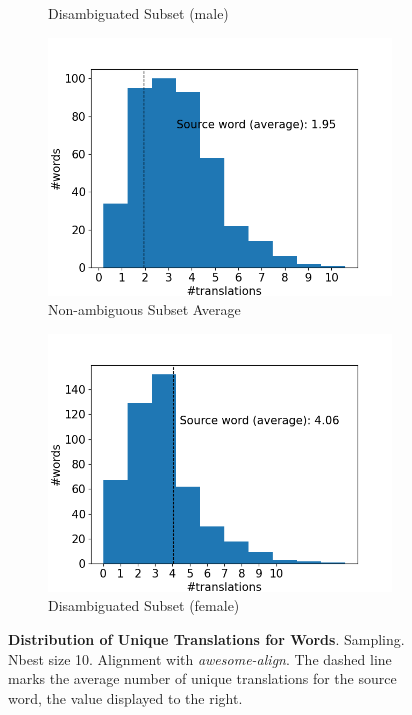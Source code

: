 \begin{figure}[!htb]
\begin{subfigure}{0.49\textwidth}
         \caption{Disambiguated Subset (male)}
     \end{subfigure}
     \begin{subfigure}{0.49\textwidth}
         \centering
         \includegraphics[width=\textwidth]{figures/alignment/align_sampling/word_translations_average.png}
         \caption{Non-ambiguous Subset Average}
     \end{subfigure}
     \hfill
     \begin{subfigure}{0.49\textwidth}
         \centering
         \includegraphics[width=\textwidth]{figures/alignment/align_sampling/word_translations_female.png}
         \caption{Disambiguated Subset (female)}
     \end{subfigure}
        \caption{\textbf{Distribution of Unique Translations for Words}. Sampling. Nbest size 10. Alignment with \textit{awesome-align}. The dashed line marks the average number of unique translations for the source word, the value displayed to the right.}
        \label{fig:alignment_graphs_translation_sampling}

\end{figure}

